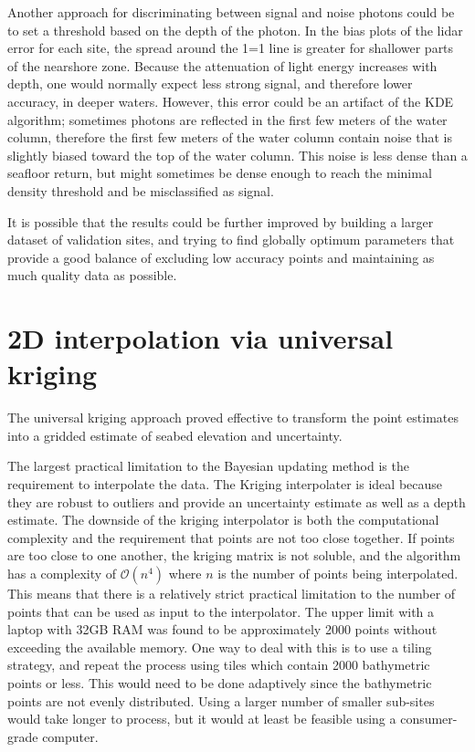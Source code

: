 Another approach for discriminating between signal and noise photons could be to set a threshold based on the depth of the photon. In the bias plots of the lidar error for each site, the spread around the 1=1 line is greater for shallower parts of the nearshore zone. Because the attenuation of light energy increases with depth, one would normally expect less strong signal, and therefore lower accuracy, in deeper waters. However, this error could be an artifact of the KDE algorithm; sometimes photons are reflected in the first few meters of the water column, therefore the first few meters of the water column contain noise that is slightly biased toward the top of the water column. This noise is less dense than a seafloor return, but might sometimes be dense enough to reach the minimal density threshold and be misclassified as signal. 

It is possible that the results could be further improved by building a larger dataset of validation sites, and trying to find globally optimum parameters that provide a good balance of excluding low accuracy points and maintaining as much quality data as possible.

\section{2D interpolation via universal kriging}

The universal kriging approach proved effective to transform the point estimates into a gridded estimate of seabed elevation and uncertainty. 

The largest practical limitation to the Bayesian updating method is the requirement to interpolate the data. The Kriging interpolater is ideal because they are robust to outliers and provide an uncertainty estimate as well as a depth estimate. The downside of the kriging interpolator is both the computational complexity and the requirement that points are not too close together. If points are too close to one another, the kriging matrix is not soluble, and the algorithm has a complexity of $\mathcal{O}(n^4)$ where $n$ is the number of points being interpolated. This means that there is a relatively strict practical limitation to the number of points that can be used as input to the interpolator. The upper limit with a laptop with 32GB RAM was found to be approximately 2000 points without exceeding the available memory. One way to deal with this is to use a tiling strategy, and repeat the process using tiles which contain 2000 bathymetric points or less. This would need to be done adaptively since the bathymetric points are not evenly distributed. Using a larger number of smaller sub-sites would take longer to process, but it would at least be feasible using a consumer-grade computer.

